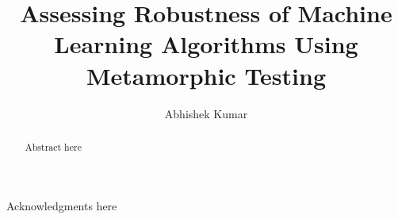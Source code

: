 \documentclass[print,ms]{unothesis}
\begin{document}
\title{Assessing Robustness of Machine Learning Algorithms Using Metamorphic Testing}
\author{Abhishek Kumar}
\memberc{\ } %

\maketitle

\begin{abstract}
 Abstract here
\end{abstract}

\frontmatter



\begin{acknowledgments}
 Acknowledgments here
\end{acknowledgments}


\setlength{\beforechapskip}{-40pt} %
\renewcommand*\contentsname{Table of Contents}
\tableofcontents  %
\listoffigures
\listoftables
\end{document}
